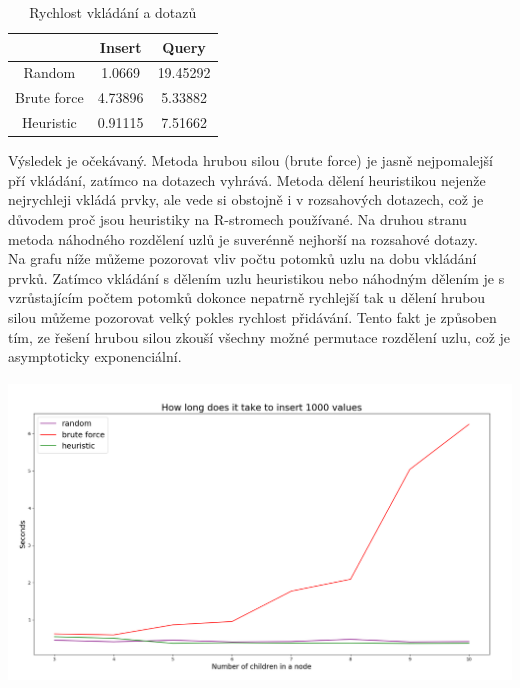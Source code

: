 \documentclass[12pt,a4paper]{article}
\begin{document}
\begin{table}[ht]
\begin{center}
\caption{Rychlost vkládání a dotazů}
\label{tbl:bins} %
\begin{tabular}{|c|cc|} 
\hline
\multicolumn{1}{|c}{} & \multicolumn{1}{c}{Insert} & \multicolumn{1}{c|}{Query} \\
\hline
Random & 1.0669 &   19.45292 \\
\hline
Brute force & 4.73896 &   5.33882 \\
\hline
Heuristic & 0.91115 &   7.51662 \\
\hline
\end{tabular}
\end{center}
\end{table}

Výsledek je očekávaný. Metoda hrubou silou (brute force) je jasně nejpomalejší pří vkládání, zatímco na dotazech vyhrává. Metoda dělení heuristikou nejenže nejrychleji vkládá prvky, ale vede si obstojně i v rozsahových dotazech, což je důvodem proč jsou heuristiky na R-stromech používané. Na druhou stranu metoda náhodného rozdělení uzlů je suverénně nejhorší na rozsahové dotazy.\\[0.5cm]
Na grafu níže můžeme pozorovat vliv počtu potomků uzlu na dobu vkládání prvků. Zatímco vkládání s dělením uzlu heuristikou nebo náhodným dělením je s vzrůstajícím počtem potomků dokonce nepatrně rychlejší tak u dělení hrubou silou můžeme pozorovat velký pokles rychlost přidávání. Tento fakt je způsoben tím, ze řešení hrubou silou zkouší všechny možné permutace rozdělení uzlu, což je asymptoticky exponenciální.

\begin{center}
\includegraphics[width=15cm, height=8cm]{nOfChildren}
\end{center}
\end{document}
